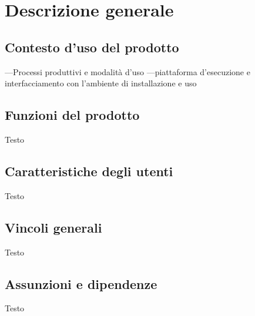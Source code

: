 \section{Descrizione generale}

\subsection{Contesto d'uso del prodotto}
---Processi produttivi e modalità d'uso
---piattaforma d'esecuzione e interfacciamento con l'ambiente di installazione e uso

\subsection{Funzioni del prodotto}
Testo

\subsection{Caratteristiche degli utenti}
Testo

\subsection{Vincoli generali}
Testo

\subsection{Assunzioni e dipendenze}
Testo
